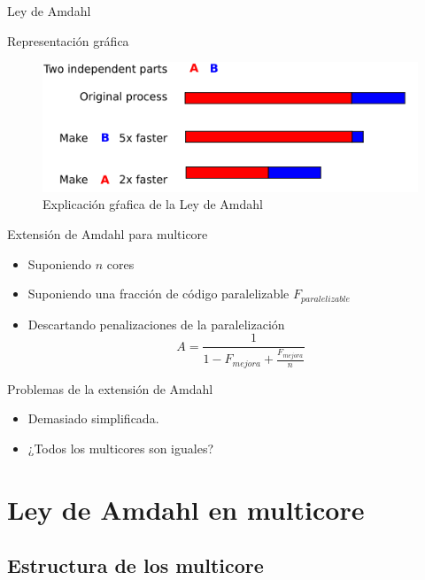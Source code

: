 \documentclass[utf8]{beamer}
\begin{document}
\begin{frame}[allowframebreaks]{Ley de Amdahl}
    \begin{block}{Representación gráfica}
        \begin{figure}[htp]
            \begin{center}
            \includegraphics[width=.7\linewidth]{amdahl}
            \caption{Explicación gŕafica de la Ley de Amdahl}
            \label{fig:amdahl}
            \end{center}
        \end{figure}
    \end{block}
    \begin{block}{Extensión de Amdahl para multicore}
        \begin{itemize}
            \item Suponiendo $n$ cores
            \item Suponiendo una fracción de código paralelizable $F_{paralelizable}$
            \item Descartando penalizaciones de la paralelización
            $$ A = \frac{1}{1 - F_{mejora} + \frac{F_{mejora}}{n}} $$
        \end{itemize}
    \end{block}
    \begin{block}{Problemas de la extensión de Amdahl}
        \begin{itemize}
            \item Demasiado simplificada.
            \item ¿Todos los multicores son iguales?
        \end{itemize}
    \end{block}
\end{frame}

\section{Ley de Amdahl en multicore}

\subsection*{Estructura de los multicore}
\end{document}
